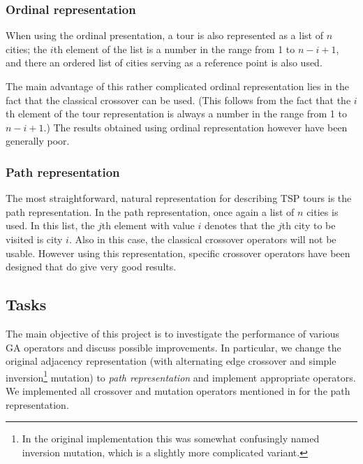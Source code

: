 ﻿\documentclass[a4paper,english,11pt,]{scrartcl}
\begin{document}

\subsubsection{Ordinal representation}
When using the ordinal presentation, a tour is also represented as a list of $n$ cities; the $i$th element of the list is a number
in the range from 1 to $n - i + 1$, and there an ordered list of cities serving as a reference point is also used. 

The main advantage of this rather complicated ordinal representation lies in the fact that the classical crossover can be used. (This follows from the fact that the $i$th element of the tour representation is always a number in the range from 1 to $n -i + 1$.) The results obtained using ordinal representation however have been generally poor. 


\subsubsection{Path representation}
The most straightforward, natural representation for describing TSP tours is the path representation. In the path representation, once again a list of $n$ cities is used. In this list, the $j$th element with value $i$ denotes that the $j$th city to be visited is city $i$. Also in this case, the classical crossover operators will not be usable. 
However using this representation, specific crossover operators have been designed that do give very good results.

\subsection{Tasks}

The main objective of this project is to investigate the performance of various GA operators and discuss possible improvements. 
In particular, we change the original adjacency representation (with alternating edge crossover and simple inversion\footnote{In the original implementation this was somewhat confusingly named inversion mutation, which is a slightly more complicated variant.} mutation) to \emph{path representation} and implement appropriate operators. We implemented all crossover and mutation operators mentioned in \cite{affenzeller2009genetic} for the path representation. 
\end{document}
